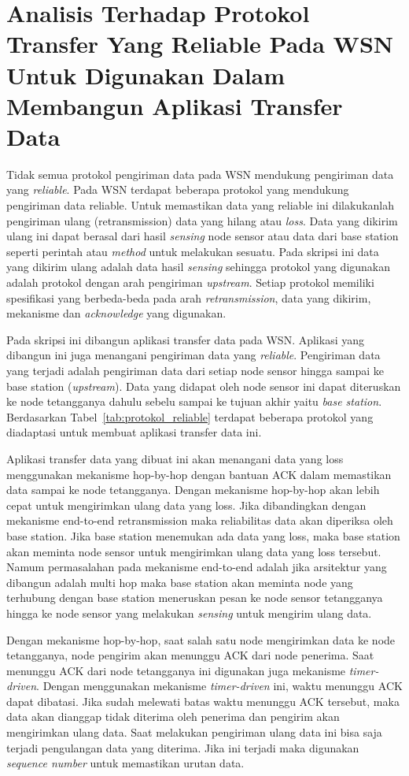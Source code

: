 \section{Analisis Terhadap Protokol Transfer Yang Reliable Pada WSN Untuk Digunakan Dalam Membangun Aplikasi Transfer Data}
Tidak semua protokol pengiriman data pada WSN mendukung pengiriman data yang \textit{reliable}. Pada WSN terdapat beberapa protokol yang mendukung pengiriman data reliable. Untuk memastikan data yang reliable ini dilakukanlah pengiriman ulang (retransmission) data yang hilang atau \textit{loss}. Data yang dikirim ulang ini dapat berasal dari hasil \textit{sensing} node sensor atau data dari base station seperti perintah atau \textit{method} untuk melakukan sesuatu. Pada skripsi ini data yang dikirim ulang adalah data hasil \textit{sensing} sehingga protokol yang digunakan adalah protokol dengan arah pengiriman \textit{upstream}. Setiap protokol memiliki spesifikasi yang berbeda-beda pada arah \textit{retransmission}, data yang dikirim, mekanisme dan \textit{acknowledge} yang digunakan. 

Pada skripsi ini dibangun aplikasi transfer data pada WSN. Aplikasi yang dibangun ini juga menangani pengiriman data yang \textit{reliable}. Pengiriman data yang terjadi adalah pengiriman data dari setiap node sensor hingga sampai ke base station (\textit{upstream}). Data yang didapat oleh node sensor ini dapat diteruskan ke node tetangganya dahulu sebelu sampai ke tujuan akhir yaitu \textit{base station}. Berdasarkan Tabel~\ref{tab:protokol_reliable} terdapat beberapa protokol yang diadaptasi untuk membuat aplikasi transfer data ini. 

Aplikasi transfer data yang dibuat ini akan menangani data yang loss menggunakan mekanisme hop-by-hop dengan bantuan ACK dalam memastikan data sampai ke node tetangganya. Dengan mekanisme hop-by-hop akan lebih cepat untuk mengirimkan ulang data yang loss. Jika dibandingkan dengan mekanisme end-to-end retransmission maka reliabilitas data akan diperiksa oleh base station. Jika base station menemukan ada data yang loss, maka base station akan meminta node sensor untuk mengirimkan ulang data yang loss tersebut. Namum permasalahan pada mekanisme end-to-end adalah jika arsitektur yang dibangun adalah multi hop maka base station akan meminta node yang terhubung dengan base station meneruskan pesan ke node sensor tetangganya hingga ke node sensor yang melakukan \textit{sensing} untuk mengirim ulang data. 

Dengan mekanisme hop-by-hop, saat salah satu node mengirimkan data ke node tetangganya, node pengirim akan menunggu ACK dari node penerima. Saat menunggu ACK dari node tetangganya ini digunakan juga mekanisme \textit{timer-driven}. Dengan menggunakan mekanisme \textit{timer-driven} ini, waktu menunggu ACK dapat dibatasi. Jika sudah melewati batas waktu menunggu ACK tersebut, maka data akan dianggap tidak diterima oleh penerima dan pengirim akan mengirimkan ulang data. Saat melakukan pengiriman ulang data ini bisa saja terjadi pengulangan data yang diterima. Jika ini terjadi maka digunakan \textit{sequence number} untuk memastikan urutan data.

